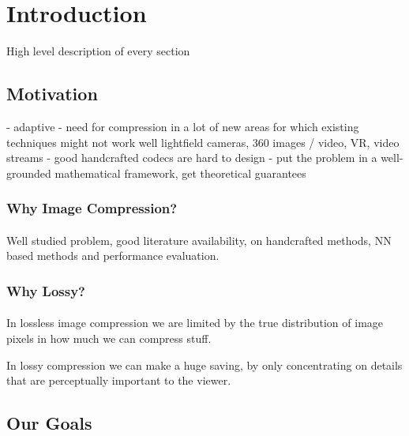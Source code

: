 \documentclass{article}
\begin{document}
\newpage

\tableofcontents

\newpage

%
%

\section{Introduction}

High level description of every section

\subsection{Motivation}
- adaptive
- need for compression in a lot of new areas for which existing techniques might
not work well
lightfield cameras, 360 images / video, VR, video streams
- good handcrafted codecs are hard to design
- put the problem in a well-grounded mathematical framework, get theoretical guarantees

\subsubsection{Why Image Compression?}
\paragraph{}
Well studied problem, good literature availability, on handcrafted methods, NN
based methods and performance evaluation.

\subsubsection{Why Lossy?}
\paragraph{}
In lossless image compression we are limited by the true distribution of image
pixels in how much we can compress stuff.

In lossy compression we can make a huge saving, by only concentrating on details
that are perceptually important to the viewer.

\subsection{Our Goals}
\end{document}
